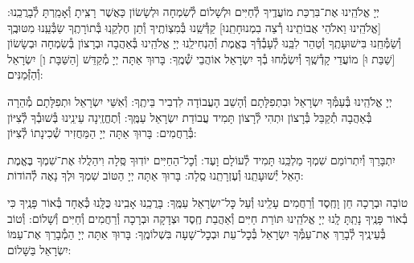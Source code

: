 \documentclass[twoside, openany, parskip=half, 11pt]{book}
\begin{document}
יְיָ אֱלֹהֵֽינוּ אֶת־בִּרְכַּת מוֹעֲדֶֽיךָ לְ֯חַיִּים וּלְשָׁלוֹם לְ֯שִׂמְחָה וּלְשָׂשׂוֹן כַּאֲשֶׁר רָצִֽיתָ וְ֯אָמַֽרְתָּ לְ֯בָרֲכֵֽנוּ: [\shabbos אֱלֹהֵֽינוּ וֵאלֹהֵי אֲבוֹתֵֽינוּ רְ֯צֵה בִמְנוּחָתֵֽנוּ] קַדְּ֯שֵֽׁנוּ בְּ֯מִצְוֹתֶֽיךָ וְ֯תֵן חֶלְקֵֽנוּ בְּ֯תוֹרָתֶֽךָ שַׂבְּ֯עֵֽנוּ מִטּוּבֶֽךָ וְ֯שַׂמְּ֯חֵֽנוּ בִּישׁוּעָתֶֽךָ וְ֯טַהֵר לִבֵּֽנוּ לְ֯עָבְ֯דְּ֯ךָ בֶּאֱמֶת וְ֯הַנְחִילֵֽנוּ יְיָ אֱלֹהֵֽינוּ בְּ֯אַהֲבָה וּבְרָצוֹן בְּ֯שִׂמְחָה וּבְשָׂשׂוֹן [\shabbos שַׁבַּת וּ] מוֹעֲדֵי קָדְ֯שֶֽׁךָ וְ֯יִשְׂמְ֯חוּ בְ֯ךָ יִשְׂרָאֵל אוֹהֲבֵי שְׁ֯מֶֽךָ: בָּרוּךְ אַתָּה יְיָ מְ֯קַדֵּשׁ
[\shabbos הַשַּׁבָּת וְ] יִשְׂרָאֵל וְ֯הַזְּ֯מַנִּים:


יְיָ אֱלֹהֵֽינוּ בְּ֯עַמְּ֯ךָ יִשְׂרָאֵל וּבִתְפִלָּתָם וְ֯הָשֵׁב הָעֲבוֹדָה לִדְבִיר בֵּיתֶֽךָ: וְ֯אִשֵּׁי יִשְׂרָאֵל וּתְפִלָּתָם מְ֯הֵרָה בְּ֯אַהֲבָה תְ֯קַבֵּל בְּ֯רָצוֹן וּתְהִי לְ֯רָצוֹן תָּמִיד עֲבוֹדַת יִשְׂרָאֵל עַמֶּֽךָ: וְ֯תֶחֱזֶֽינָה עֵינֵֽינוּ בְּ֯שׁוּבְ֯ךָ לְ֯צִיּוֹן בְּ֯רַחֲמִים: בָּרוּךְ אַתָּה יְיָ הַמַּחֲזִיר שְׁ֯כִינָתוֹ לְ֯צִיּוֹן:

\modim


\vspace{-\baselineskip}
יִתְבָּרַךְ וְ֯יִתְרוֹמַם שִׁמְךָ מַלְכֵּֽנוּ תָּמִיד לְ֯עוֹלָם וָעֶד: וְ֯כׇל־הַחַיִּים יוֹדֽוּךָ סֶּֽלָה וִיהַלֲלוּ אֶת־שִׁמְךָ בֶּאֱמֶת הָאֵל יְ֯שׁוּעָתֵֽנוּ וְ֯עֶזְרָתֵֽנוּ סֶֽלָה: בָּרוּךְ אַתָּה יְיָ הַטּוֹב שִׁמְךָ וּלְךָ נָאֶה לְ֯הוֹדוֹת:



טוֹבָה וּבְרָכָה חֵן וָחֶֽסֶד וְ֯רַחֲמִים עָלֵֽינוּ וְ֯עַל כׇּל־יִשְׂרָאֵל עַמֶּֽךָ: בָּרֲכֵֽנוּ אָבִֽינוּ כֻּלָּֽנוּ כְּ֯אֶחָד בְּ֯אוֹר פָּנֶֽיךָ כִּי בְ֯אוֹר פָּנֶֽיךָ נָתַֽתָּ לָֽנוּ יְיָ אֱלֹהֵֽינוּ תּוֹרַת חַיִּים וְ֯אַהֲבַת חֶֽסֶד וּצְדָקָה וּבְרָכָה וְ֯רַחֲמִים וְ֯חַיִּים וְ֯שָׁלוֹם: וְ֯טוֹב בְּ֯עֵינֶֽיךָ לְ֯בָרֵךְ אֶת־עַמְּ֯ךָ יִשְׂרָאֵל בְּ֯כׇל־עֵת וּבְכׇל־שָׁעָה בִּשְׁלוֹמֶֽךָ: בָּרוּךְ אַתָּה יְיָ הַמְ֯בָרֵךְ אֶת־עַמּוֹ יִשְׂרָאֵל בַּשָּׁלוֹם:

\tachanunim

\vfill


\\

\sepline

\\
\\
\end{document}
